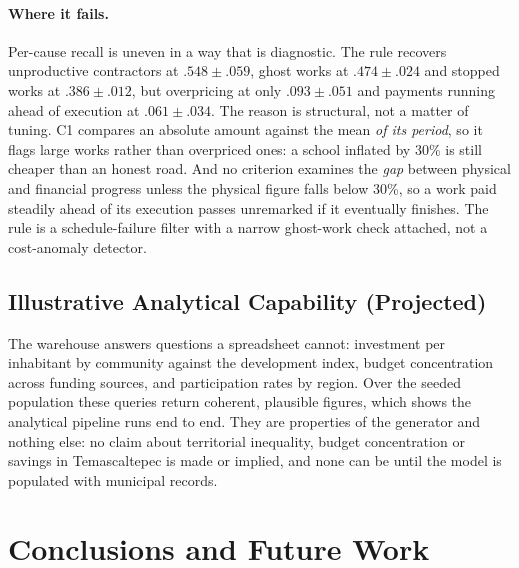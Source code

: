 \documentclass[runningheads]{llncs}
\renewcommand{\_}{\origunderscore\allowbreak}
\begin{document}
\paragraph{Where it fails.} Per-cause recall is uneven in a way that is
diagnostic. The rule recovers unproductive contractors at $.548 \pm .059$,
ghost works at $.474 \pm .024$ and stopped works at $.386 \pm .012$, but
overpricing at only $.093 \pm .051$ and payments running ahead of execution at
$.061 \pm .034$. The reason is structural, not a matter of tuning. C1 compares an absolute
amount against the mean \emph{of its period}, so it flags large works rather
than overpriced ones: a school inflated by 30\% is still cheaper than an honest road.
And no criterion examines the \emph{gap} between physical and financial progress
unless the physical figure falls below 30\%, so a work paid steadily ahead of
its execution passes unremarked if it eventually finishes. The rule is a
schedule-failure filter with a narrow ghost-work check attached, not a
cost-anomaly detector.



\subsection{Illustrative Analytical Capability (Projected)}
\label{sec:impacto-social}

The warehouse answers questions a spreadsheet cannot: investment per
inhabitant by community against the development index, budget concentration
across funding sources, and participation rates by region. Over the seeded
population these queries return coherent, plausible figures, which shows the
analytical pipeline runs end to end. They are properties of the generator and
nothing else: no claim about territorial inequality, budget concentration or
savings in Temascaltepec is made or implied, and none can be until the model
is populated with municipal records.

\section{Conclusions and Future Work}
\label{sec:conclusiones}
\end{document}
